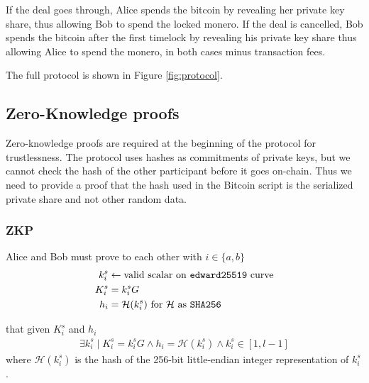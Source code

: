\documentclass{llncs}
\begin{document}
If the deal goes through, Alice spends the bitcoin by revealing her private key share, thus allowing Bob to spend the locked monero. If the deal is cancelled, Bob spends the bitcoin after the first timelock by revealing his private key share thus allowing Alice to spend the monero, in both cases minus transaction fees.

The full protocol is shown in Figure \ref{fig:protocol}.

\subsection{Zero-Knowledge proofs}
Zero-knowledge proofs are required at the beginning of the protocol for trustlessness. The protocol uses hashes as commitments of private keys, but we cannot check the hash of the other participant before it goes on-chain. Thus we need to provide a proof that the hash used in the Bitcoin script is the serialized private share and not other random data.

\subsubsection{ZKP}
Alice and Bob must prove to each other with $i \in \{a, b\}$
\begin{equation}
\begin{split}
    k^s_i &\leftarrow \text{valid scalar on \texttt{edward25519} curve} \\
    K^s_i &= k^s_iG \\
    h_i &= \mathcal{H}(k^s_i) \text{ for $\mathcal{H}$ as \texttt{SHA256}} \\
\end{split}
\end{equation}

that given $K^s_i$ and $h_i$
\begin{equation}
\begin{split}
    \exists k^s_i \mid K^s_i = k^s_iG \land h_i = \mathcal{H}(k^s_i) \land k^s_i \in [1, l-1]
\end{split}
\end{equation}
where $\mathcal{H}(k^s_i)$ is the hash of the 256-bit little-endian integer representation of $k^s_i$.
\end{document}
